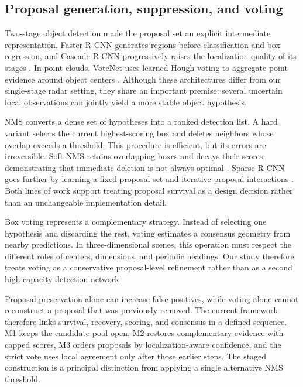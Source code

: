 \documentclass[preprint,12pt,times]{elsarticle}
\begin{document}
\subsection{Proposal generation, suppression, and voting}

Two-stage object detection made the proposal set an explicit intermediate
representation. Faster R-CNN generates regions before classification and box
regression, and Cascade R-CNN progressively raises the localization quality of
its stages \cite{ren2017fasterrcnn,cai2018cascadercnn}. In point clouds,
VoteNet uses learned Hough voting to aggregate point evidence around object
centers \cite{qi2019votenet}. Although these architectures differ from our
single-stage radar setting, they share an important premise: several uncertain
local observations can jointly yield a more stable object hypothesis.

NMS converts a dense set of hypotheses into a ranked detection list. A hard
variant selects the current highest-scoring box and deletes neighbors whose
overlap exceeds a threshold. This procedure is efficient, but its errors are
irreversible. Soft-NMS retains overlapping boxes and decays their scores,
demonstrating that immediate deletion is not always optimal
\cite{bodla2017softnms}. Sparse R-CNN goes further by learning a fixed proposal
set and iterative proposal interactions \cite{sun2021sparsercnn}. Both lines
of work support treating proposal survival as a design decision rather than an
unchangeable implementation detail.

Box voting represents a complementary strategy. Instead of selecting one
hypothesis and discarding the rest, voting estimates a consensus geometry from
nearby predictions. In three-dimensional scenes, this operation must respect
the different roles of centers, dimensions, and periodic headings. Our study
therefore treats voting as a conservative proposal-level refinement rather
than as a second high-capacity detection network.

Proposal preservation alone can increase false positives, while voting alone
cannot reconstruct a proposal that was previously removed. The current
framework therefore links survival, recovery, scoring, and consensus in a
defined sequence. M1 keeps the candidate pool open, M2 restores complementary
evidence with capped scores, M3 orders proposals by localization-aware
confidence, and the strict vote uses local agreement only after those earlier
steps. The staged construction is a principal distinction from applying a
single alternative NMS threshold.
\end{document}
